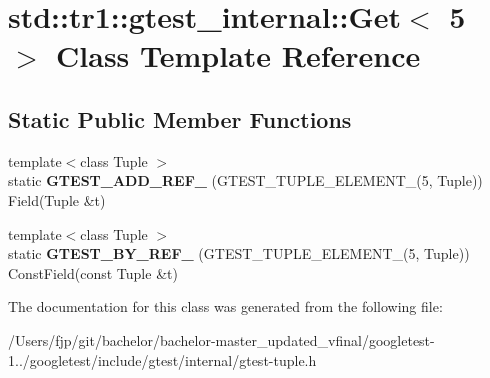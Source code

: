 \hypertarget{classstd_1_1tr1_1_1gtest__internal_1_1_get_3_015_01_4}{}\section{std\+:\+:tr1\+:\+:gtest\+\_\+internal\+:\+:Get$<$ 5 $>$ Class Template Reference}
\label{classstd_1_1tr1_1_1gtest__internal_1_1_get_3_015_01_4}
\subsection*{Static Public Member Functions}
\begin{DoxyCompactItemize}
\item 
\mbox{\label{classstd_1_1tr1_1_1gtest__internal_1_1_get_3_015_01_4_a0a337088bab3f824f67d1607229fdcc2}} 
{\footnotesize template$<$class Tuple $>$ }\\static {\bfseries G\+T\+E\+S\+T\+\_\+\+A\+D\+D\+\_\+\+R\+E\+F\+\_\+} (G\+T\+E\+S\+T\+\_\+\+T\+U\+P\+L\+E\+\_\+\+E\+L\+E\+M\+E\+N\+T\+\_\+(5, Tuple)) Field(Tuple \&t)
\item 
\mbox{\label{classstd_1_1tr1_1_1gtest__internal_1_1_get_3_015_01_4_ae10fe16450db82d69b9a4d0b149ca75d}} 
{\footnotesize template$<$class Tuple $>$ }\\static {\bfseries G\+T\+E\+S\+T\+\_\+\+B\+Y\+\_\+\+R\+E\+F\+\_\+} (G\+T\+E\+S\+T\+\_\+\+T\+U\+P\+L\+E\+\_\+\+E\+L\+E\+M\+E\+N\+T\+\_\+(5, Tuple)) Const\+Field(const Tuple \&t)
\end{DoxyCompactItemize}


The documentation for this class was generated from the following file\+:\begin{DoxyCompactItemize}
\item 
/\+Users/fjp/git/bachelor/bachelor-\/master\+\_\+updated\+\_\+vfinal/googletest-\/1../googletest/include/gtest/internal/gtest-\/tuple.\+h\end{DoxyCompactItemize}
